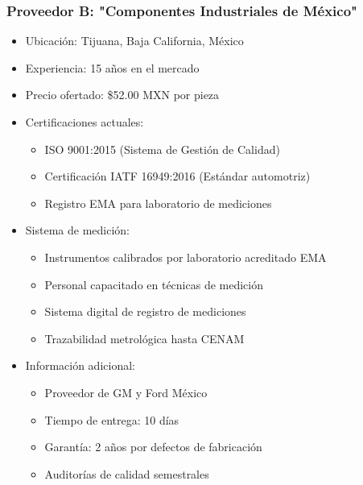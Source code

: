\documentclass{article}
\begin{document}
\subsubsection*{Proveedor B: "Componentes Industriales de México"}
\begin{itemize}
    \item Ubicación: Tijuana, Baja California, México
    \item Experiencia: 15 años en el mercado
    \item Precio ofertado: \$52.00 MXN por pieza
    \item Certificaciones actuales:
    \begin{itemize}
        \item ISO 9001:2015 (Sistema de Gestión de Calidad)
        \item Certificación IATF 16949:2016 (Estándar automotriz)
        \item Registro EMA para laboratorio de mediciones
    \end{itemize}
    \item Sistema de medición:
    \begin{itemize}
        \item Instrumentos calibrados por laboratorio acreditado EMA
        \item Personal capacitado en técnicas de medición
        \item Sistema digital de registro de mediciones
        \item Trazabilidad metrológica hasta CENAM
    \end{itemize}
    \item Información adicional:
    \begin{itemize}
        \item Proveedor de GM y Ford México
        \item Tiempo de entrega: 10 días
        \item Garantía: 2 años por defectos de fabricación
        \item Auditorías de calidad semestrales
    \end{itemize}
\end{itemize}
\end{document}
